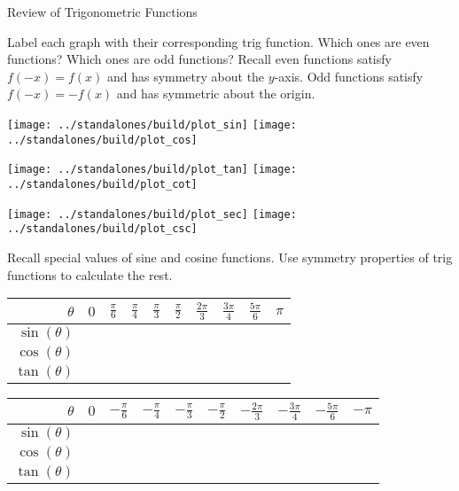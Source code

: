 \documentclass[../main.tex]{subfiles}
\begin{document}
\begin{lesson}{Review of Trigonometric Functions}
  \begin{example}
    Label each graph with their corresponding trig function. Which ones are even functions? Which ones are odd functions?  \newline
    {\footnotesize Recall even functions satisfy \(f(-x) = f(x)\) and has symmetry about the \(y\)-axis. Odd functions satisfy \(f(-x) = -f(x)\) and has symmetric about the origin.}

    \begin{center}
      \texttt{[image: ../standalones/build/plot\_sin]}
      \hspace{0.5in}
      \texttt{[image: ../standalones/build/plot\_cos]}
    \end{center}
    \vfill{}

    \begin{center}
      \texttt{[image: ../standalones/build/plot\_tan]}
      \hspace{0.5in}
      \texttt{[image: ../standalones/build/plot\_cot]}
    \end{center}
    \vfill{}

    \begin{center}
      \texttt{[image: ../standalones/build/plot\_sec]}
      \hspace{0.5in}
      \texttt{[image: ../standalones/build/plot\_csc]}
    \end{center}
    \vfill{}
  \end{example}

  \begin{example}
    Recall special values of sine and cosine functions. Use symmetry properties of trig functions to calculate the rest.

    \begin{tabular}{r|p{1cm}|p{1cm}|p{1cm}|p{1cm}|p{1cm}|p{1cm}|p{1cm}|p{1cm}|p{1cm}}
      \(\theta\) & \(0\) & \(\frac{\pi}{6}\) & \(\frac{\pi}{4}\) & \(\frac{\pi}{3}\) & \(\frac{\pi}{2}\) & \(\frac{2\pi}{3}\) & \(\frac{3\pi}{4}\) & \(\frac{5\pi}{6}\) & \(\pi\) \\\midrule
      \(\sin(\theta)\) &&&&&&&&&\\[3ex]\midrule
      \(\cos(\theta)\) &&&&&&&&&\\[3ex]\midrule
      \(\tan(\theta)\) &&&&&&&&&\\[3ex]
    \end{tabular}

    \begin{tabular}{r|p{1cm}|p{1cm}|p{1cm}|p{1cm}|p{1cm}|p{1cm}|p{1cm}|p{1cm}|p{1cm}}
      \(\theta\) & \(0\) & \(-\frac{\pi}{6}\) & \(-\frac{\pi}{4}\) & \(-\frac{\pi}{3}\) & \(-\frac{\pi}{2}\) & \(-\frac{2\pi}{3}\) & \(-\frac{3\pi}{4}\) & \(-\frac{5\pi}{6}\) & \(-\pi\) \\\midrule
      \(\sin(\theta)\) &&&&&&&&&\\[3ex]\midrule
      \(\cos(\theta)\) &&&&&&&&&\\[3ex]\midrule
      \(\tan(\theta)\) &&&&&&&&&\\[3ex]
    \end{tabular}
  \end{example}
  \vfill{}

  \clearpage
\end{lesson}
\end{document}
